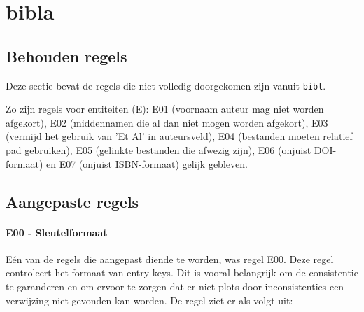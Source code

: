 \section{bibla}
\subsection{Behouden regels}
Deze sectie bevat de regels die niet volledig doorgekomen zijn vanuit \texttt{bibl}.

Zo zijn regels voor entiteiten (E): E01 (voornaam auteur mag niet worden afgekort), E02 (middennamen die al dan niet mogen worden afgekort), E03 (vermijd het gebruik van 'Et Al' in auteursveld), E04 (bestanden moeten relatief pad gebruiken), E05 (gelinkte bestanden die afwezig zijn), E06 (onjuist DOI-formaat) en E07 (onjuist ISBN-formaat) gelijk gebleven. 

\subsection{Aangepaste regels}
\paragraph{E00 - Sleutelformaat}
\label{rule:E00}
Eén van de regels die aangepast diende te worden, was regel E00. Deze regel controleert het formaat van entry keys. Dit is vooral belangrijk om de consistentie te garanderen en om ervoor te zorgen dat er niet plots door inconsistenties een verwijzing niet gevonden kan worden. De regel ziet er als volgt uit:

